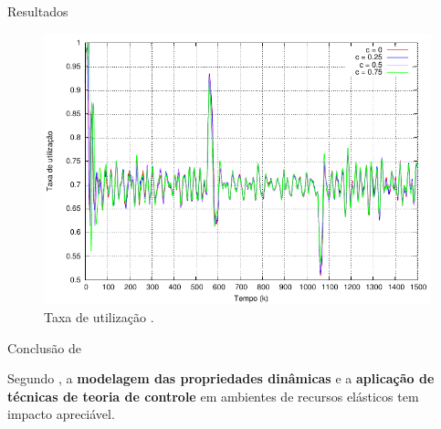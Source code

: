 \begin{frame}{Resultados}
	
	\begin{figure}
		\center
		\includegraphics[scale=0.65]{images/resposta-nobile.pdf}
		\caption{Taxa de utilização \cite{Nobile2013}.}
		\label{fig:taxa-nobile}
	\end{figure}
	
\end{frame}

\begin{frame}{Conclusão de \cite{Nobile2013}}
	
	Segundo \cite{Nobile2013}, a \textbf{modelagem das propriedades dinâmicas} e a \textbf{aplicação de técnicas de teoria de controle} em ambientes de recursos elásticos tem impacto apreciável. 
\end{frame}



